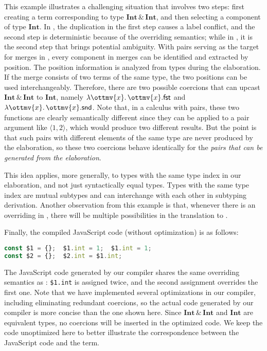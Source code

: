 \noindent
This example illustrates a challenging situation that involves two steps: first
creating a term corresponding to type $ \mathbf{Int}   \, {\&} \,   \mathbf{Int} $, and then selecting a
component of type $ \mathbf{Int} $. In \lambdar, the duplication in the first step
causes a label conflict, and the second step is deterministic because of the
overriding semantics; while in \lambdac, it is the second step that brings
potential ambiguity. With pairs serving as the target for merges in \lambdac,
every component in merges can be identified and extracted by position. The
position information is analyzed from types during the elaboration. If the merge
consists of two terms of the same type, the two positions can be used
interchangeably. Therefore, there are two possible coercions that can upcast
$ \mathbf{Int}   \, {\&} \,   \mathbf{Int} $ to $ \mathbf{Int} $, namely $  \lambda \ottmv{x} .\, \ottmv{x}   . \mathsf{fst} $ and $  \lambda \ottmv{x} .\, \ottmv{x}   . \mathsf{snd} $. Note that,
in a calculus with pairs, these two functions are clearly semantically different
since they can be applied to a pair argument like $ \langle  1 ,  2  \rangle $, which would
produce two different results. But the point is that such pairs with different
elements of the same type are never produced by the elaboration, so these two
coercions behave identically for the \emph{pairs that can be generated from the
elaboration}.

This idea applies, more generally, to types with the same type index in our
elaboration, and not just syntactically equal types. Types with the same type
index are mutual subtypes and can interchange with each other in subtyping
derivation. Another observation from this example is that, whenever there is an
overriding in \lambdar, there will be multiple possibilities in the translation
to \lambdac.

Finally, the compiled JavaScript code (without optimization) is as follows:
\begin{lstlisting}[language=TypeScript,xleftmargin=.28\textwidth]
const $1 = {};  $1.int = 1;  $1.int = 1;
const $2 = {};  $2.int = $1.int;
\end{lstlisting}
The JavaScript code generated by our compiler shares the same overriding
semantics as \lambdar: \lstinline{$1.int} is assigned twice, and the second
assignment overrides the first one. Note that we have implemented several
optimizations in our compiler, including eliminating redundant coercions, so the
actual code generated by our compiler is more concise than the one shown here.
Since $ \mathbf{Int}   \, {\&} \,   \mathbf{Int} $ and $ \mathbf{Int} $ are equivalent types, no coercions will be
inserted in the optimized code. We keep the code unoptimized here to better
illustrate the correspondence between the JavaScript code and the \lambdar term.

